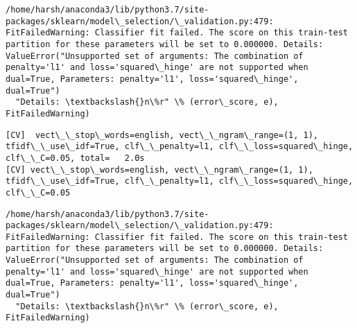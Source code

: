 \documentclass[11pt]{article}
\begin{document}
    \begin{Verbatim}[commandchars=\\\{\}]
/home/harsh/anaconda3/lib/python3.7/site-packages/sklearn/model\_selection/\_validation.py:479: FitFailedWarning: Classifier fit failed. The score on this train-test partition for these parameters will be set to 0.000000. Details: 
ValueError("Unsupported set of arguments: The combination of penalty='l1' and loss='squared\_hinge' are not supported when dual=True, Parameters: penalty='l1', loss='squared\_hinge', dual=True")
  "Details: \textbackslash{}n\%r" \% (error\_score, e), FitFailedWarning)

    \end{Verbatim}

    \begin{Verbatim}[commandchars=\\\{\}]
[CV]  vect\_\_stop\_words=english, vect\_\_ngram\_range=(1, 1), tfidf\_\_use\_idf=True, clf\_\_penalty=l1, clf\_\_loss=squared\_hinge, clf\_\_C=0.05, total=   2.0s
[CV] vect\_\_stop\_words=english, vect\_\_ngram\_range=(1, 1), tfidf\_\_use\_idf=True, clf\_\_penalty=l1, clf\_\_loss=squared\_hinge, clf\_\_C=0.05 

    \end{Verbatim}

    \begin{Verbatim}[commandchars=\\\{\}]
/home/harsh/anaconda3/lib/python3.7/site-packages/sklearn/model\_selection/\_validation.py:479: FitFailedWarning: Classifier fit failed. The score on this train-test partition for these parameters will be set to 0.000000. Details: 
ValueError("Unsupported set of arguments: The combination of penalty='l1' and loss='squared\_hinge' are not supported when dual=True, Parameters: penalty='l1', loss='squared\_hinge', dual=True")
  "Details: \textbackslash{}n\%r" \% (error\_score, e), FitFailedWarning)

    \end{Verbatim}
\end{document}
